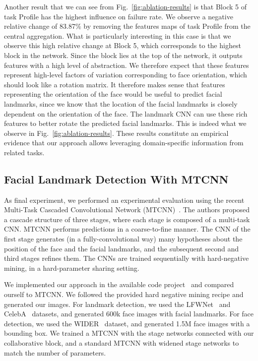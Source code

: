 \documentclass[runningheads]{llncs}
\newcommand{\citep}{\cite}
\begin{document}
Another result that we can see from Fig.~\ref{fig:ablation-results} is that Block 5 of task Profile has the highest influence on failure rate. We observe a negative relative change of 83.87\% by removing the features maps of task Profile from the central aggregation. What is particularly interesting in this case is that we observe this high relative change at Block 5, which corresponds to the highest block in the network. Since the block lies at the top of the network, it outputs features with a high level of abstraction. We therefore expect that these features represent high-level factors of variation corresponding to face orientation, which should look like a rotation matrix. It therefore makes sense that features representing the orientation of the face would be useful to predict facial landmarks, since we know that the location of the facial landmarks is closely dependent on the orientation of the face. The landmark CNN can use these rich features to better rotate the predicted facial landmarks. This is indeed what we observe in Fig.~\ref{fig:ablation-results}. These results constitute an empirical evidence that our approach allows leveraging domain-specific information from related tasks.


\subsection{Facial Landmark Detection With MTCNN}
\label{ssec:mtcnn}

As final experiment, we performed an experimental evaluation using the recent Multi-Task Cascaded Convolutional Network (MTCNN)~\citep{zhang2016joint}. The authors proposed a cascade structure of three stages, where each stage is composed of a multi-task CNN. MTCNN performs predictions in a coarse-to-fine manner. The CNN of the first stage generates (in a fully-convolutional way) many hypotheses about the position of the face and the facial landmarks, and the subsequent second and third stages refines them. The CNNs are trained sequentially with hard-negative mining, in a hard-parameter sharing setting. 


We implemented our approach in the available code project~\citep{kuaikuaikim2018DFace} and compared ourself to MTCNN. We followed the provided hard negative mining recipe and generated our images. For landmark detection, we used the LFWNet~\citep{sun2013deep} and CelebA~\citep{liu2015faceattributes} datasets, and generated 600k face images with facial landmarks. For face detection, we used the WIDER~\citep{yang2016wider} dataset, and generated 1.5M face images with a bounding box. We trained a MTCNN with the stage networks connected with our collaborative block, and a standard MTCNN with widened stage networks to match the number of parameters.
\end{document}
